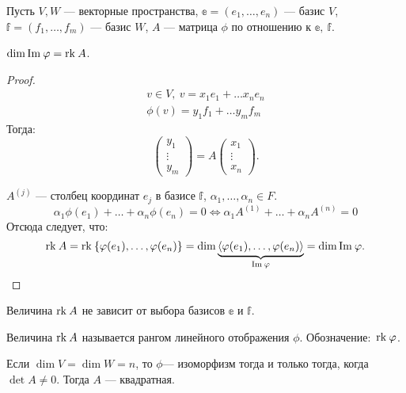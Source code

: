 Пусть $V, W$ --- векторные пространства, $\mathbb{e} = (e_1, \ldots, e_n)$ --- базис $V$, $\mathbb{f} = (f_1, \ldots, f_m)$ --- базис $W$, $A$ --- матрица $\phi$ по отношению к $\mathbb{e},\ \mathbb{f}$.

\begin{Suggestion}
    $\dim \mathrm{Im\:} \varphi = \mathrm{rk}\: A$.
\end{Suggestion}

\begin{proof}
    \begin{gather*}
        v \in V,\ v = x_1e_1 + \ldots x_ne_n\\
        \phi(v) = y_1f_1 + \ldots y_mf_m 
    \end{gather*}
    Тогда:
    $$
    \begin{pmatrix}
        y_1\\
        \vdots\\
        y_m
    \end{pmatrix}
    = A \begin{pmatrix}
        x_1\\
        \vdots\\
        x_n
    \end{pmatrix}.
    $$
   \par  $A^{\left(j\right)}$ --- столбец координат $e_j$ в базисе $\mathbb{f}$, $\alpha_1, \ldots, \alpha_n \in F$.
   \[
        \alpha_1 \phi(e_1) + \ldots + \alpha_n \phi(e_n) = 0 \Leftrightarrow \alpha_1 A^{\left(1\right)} + \ldots + \alpha_n A^{\left(n\right)} = 0
   \]
   Отсюда следует, что:
   \[
        \mathrm{rk}\: A = \mathrm{rk}\:\{\varphi(e_1), \ldots, \varphi(e_n)\} = \dim \underbrace{\langle\varphi(e_1), \ldots, \varphi(e_n)\rangle}_{\mathrm{Im\:}\varphi} = \dim \mathrm{Im\:} \varphi.
   \]
\end{proof}

\begin{Consequence}
    Величина $\mathrm{rk}\: A$ не зависит от выбора базисов $\mathbb{e}$ и $\mathbb{f}$.
\end{Consequence}

\begin{Def}
    Величина $\mathrm{rk}\: A$ называется рангом линейного отображения $\phi$. Обозначение:~$\mathrm{rk}\: \varphi$.
\end{Def}

\begin{Consequence}
    Если $\dim V = \dim W = n$, то $\phi$--- изоморфизм тогда и только тогда, когда $\det A \neq 0$. Тогда $A$ --- квадратная.
\end{Consequence}

